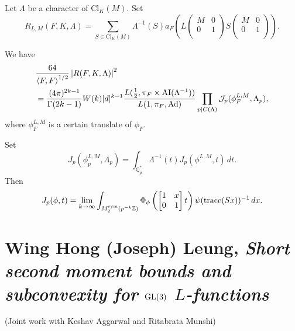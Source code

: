 \documentclass[reqno]{amsart} 
\begin{document}
Let $\Lambda$ be a character of $\mathrm{Cl}_K(M)$.  Set
\begin{equation*}
  R_{L,M} (F, K, \Lambda ) = \sum_{S \in \mathrm{Cl}_K(M) } \Lambda^{-1} (S)
  a_F \left(
    L
    \begin{pmatrix}
      M & 0 \\
      0 & 1 \\
    \end{pmatrix}
    S
    \begin{pmatrix}
      M & 0 \\
      0 & 1 \\
    \end{pmatrix}
  \right).
\end{equation*}
\begin{conjecture}
  We have
  \begin{align*}
    &\frac{64}{\left\langle F, F  \right\rangle^{1/2} }
      \left\lvert R (F, K, \Lambda ) \right\rvert^2 \\
    &= \frac{(4 \pi )^{2k - 1}}{\Gamma (2 k - 1)}
      W (k)
      \lvert d \rvert^{k - 1}
      \frac{L (\tfrac{1}{2}, \pi_F \times \operatorname{AI} (\Lambda^{-1} ))}{L (1, \pi_F, \operatorname{Ad})}
      \prod_{p | C(\Lambda)}
      \mathcal{J}_p (\phi_F^{L, M}, \Lambda_p ),
  \end{align*}
  where $\phi_F^{L, M}$ is a certain translate of $\phi_F$.
\end{conjecture}
Set
\begin{equation*}
  J_p (\phi_p^{L, M}, \Lambda_p )
  =
  \int_{\mathbb{Q}_p^\ast }
  \Lambda^{-1} (t) J_p (\phi^{L, M}, t) \, d t.
\end{equation*}
Then
\begin{equation*}
  J_p (\phi, t)
  = \lim_{k \rightarrow \infty }
  \int_{M_2^{\operatorname{sym}} (p^{- k } \mathbb{Z} )}
  \Phi_\phi \left(
    \begin{bmatrix}
      1 & x \\
      0 & 1 \\
    \end{bmatrix} t \right)
  \psi (\operatorname{trace} (S x))^{-1} \, d x.
\end{equation*}




\section{Wing Hong (Joseph) Leung, \emph{Short second moment bounds and subconvexity for $\operatorname{GL}(3)$ $L$-functions}}
(Joint work with Keshav Aggarwal and Ritabrata Munshi)
\end{document}

